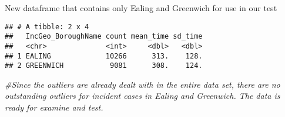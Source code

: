 \documentclass[
]{article}
\newenvironment{Shaded}{\begin{snugshade}}{\end{snugshade}}
\newcommand{\AttributeTok}[1]{\textcolor[rgb]{0.77,0.63,0.00}{#1}}
\newcommand{\CommentTok}[1]{\textcolor[rgb]{0.56,0.35,0.01}{\textit{#1}}}
\newcommand{\ConstantTok}[1]{\textcolor[rgb]{0.00,0.00,0.00}{#1}}
\newcommand{\FunctionTok}[1]{\textcolor[rgb]{0.00,0.00,0.00}{#1}}
\newcommand{\NormalTok}[1]{#1}
\newcommand{\OtherTok}[1]{\textcolor[rgb]{0.56,0.35,0.01}{#1}}
\newcommand{\SpecialCharTok}[1]{\textcolor[rgb]{0.00,0.00,0.00}{#1}}
\newcommand{\StringTok}[1]{\textcolor[rgb]{0.31,0.60,0.02}{#1}}
\begin{document}
New dataframe that contains only Ealing and Greenwich for use in our
test

\begin{Shaded}
\end{Shaded}

\begin{verbatim}
## # A tibble: 2 x 4
##   IncGeo_BoroughName count mean_time sd_time
##   <chr>              <int>     <dbl>   <dbl>
## 1 EALING             10266      313.    128.
## 2 GREENWICH           9081      308.    124.
\end{verbatim}

\begin{Shaded}
\begin{Highlighting}[]
\CommentTok{\#Since the outliers are already dealt with in the entire data set, there are no outstanding outliers for incident cases in Ealing and Greenwich. The data is ready for examine and test.}
\end{Highlighting}
\end{Shaded}
\end{document}
